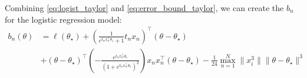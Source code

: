 Combining \eqref{eq:logist_taylor} and \eqref{eq:error_bound_taylor}, we can create the $b_n$ for the logistic regression model: 
\begin{equation*}
\begin{split}
    b_n\left(\theta\right) &= \ell\left(\theta_{\star}\right) + \left(\frac{1}{e^{t_n x_n^{\top}\theta_{\star} } + 1} t_n x_n\right)^{\top}
    \left(\theta - \theta_{\star} \right) \\ 
    &+ \left(\theta - \theta_{\star}\right)^{\top}
    \left(-\frac{e^{t_n x_n^{\top}\theta_{\star} }}{\left(1 + e^{t_n x_n^{\top}\theta_{\star} }\right)^2}\right)x_n x_n^{\top} \left(\theta - \theta_{\star}\right) - \frac{1}{24} \max_{n=1}^N \lVert x_i^3\rVert \lVert\theta-\theta_{\star}\rVert^3
    \end{split}
\end{equation*}


